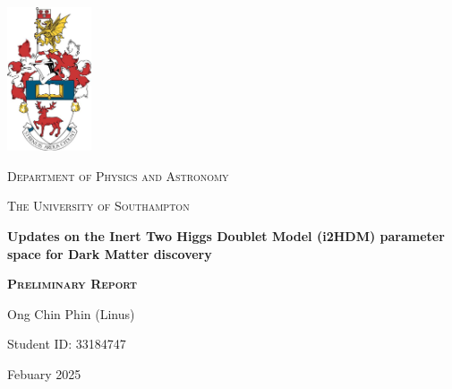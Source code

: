 \documentclass[12pt]{article}
\begin{document}
\titleformat{\section}{\large\bfseries}{\thesection}{0.5em}{}

\titleformat{\subsection}{\large\bfseries}{\thesubsection}{1em}{}

\begin{titlepage}
    \centering
    \includegraphics[width=2.5cm]{crest.jpg}\par
    \vspace{0.5cm}
    {\scshape\Large Department of Physics and Astronomy \par}
    \vspace{0.25cm}
    {\scshape\Large The University of Southampton \par}
    \vspace{1cm}
    {\huge\bfseries Updates on the Inert Two Higgs Doublet Model (i2HDM) parameter space for Dark Matter discovery\par}
    \vspace{0.25cm}
    {\scshape\Large \bfseries Preliminary Report \par}
    \vspace{1cm}
    {\Large Ong Chin Phin (Linus) \par}
    \vspace{0.25cm}
    {\large Student ID: 33184747 \par}
    \vfill
    {\large Febuary 2025 \par}
\end{titlepage}

\end{document}

